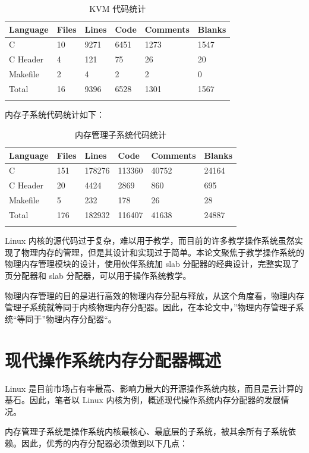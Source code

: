 \documentclass[AutoFakeBold]{LZUThesis}
\begin{document}
\begin{sloppypar}
\begin{longtable}[]{@{}llllll@{}}
\toprule\noalign{}
Language & Files & Lines & Code & Comments & Blanks \\
\midrule\noalign{}
\endhead
\bottomrule\noalign{}
\endlastfoot
C & 10 & 9271 & 6451 & 1273 & 1547 \\
C Header & 4 & 121 & 75 & 26 & 20 \\
Makefile & 2 & 4 & 2 & 2 & 0 \\
Total & 16 & 9396 & 6528 & 1301 & 1567 \\
\label{table:kvm-code-stastic}
\caption{KVM 代码统计}
\end{longtable}

内存子系统代码统计如下：

\begin{longtable}[]{@{}llllll@{}}
\toprule\noalign{}
Language & Files & Lines & Code & Comments & Blanks \\
\midrule\noalign{}
\endhead
\bottomrule\noalign{}
\endlastfoot
C & 151 & 178276 & 113360 & 40752 & 24164 \\
C Header & 20 & 4424 & 2869 & 860 & 695 \\
Makefile & 5 & 232 & 178 & 26 & 28 \\
Total & 176 & 182932 & 116407 & 41638 & 24887 \\
\label{table:mm-code-stastic}
\caption{内存管理子系统代码统计}
\end{longtable}

Linux
内核的源代码过于复杂，难以用于教学，而目前的许多教学操作系统虽然实现了物理内存的管理，但是其设计和实现过于简单。本论文聚焦于教学操作系统的物理内存管理模块的设计，使用伙伴系统加
slab 分配器的经典设计，完整实现了页分配器和 slab
分配器，可以用于操作系统教学。

物理内存管理的目的是进行高效的物理内存分配与释放，从这个角度看，物理内存管理子系统就等同于内核物理内存分配器。因此，在本论文中，''物理内存管理子系统``等同于''物理内存分配器``。


\section{现代操作系统内存分配器概述}

Linux
是目前市场占有率最高、影响力最大的开源操作系统内核，而且是云计算的基石。因此，笔者以
Linux 内核为例，概述现代操作系统内存分配器的发展情况。

内存管理子系统是操作系统内核最核心、最底层的子系统，被其余所有子系统依赖。因此，优秀的内存分配器必须做到以下几点：


\end{sloppypar}
\end{document}
